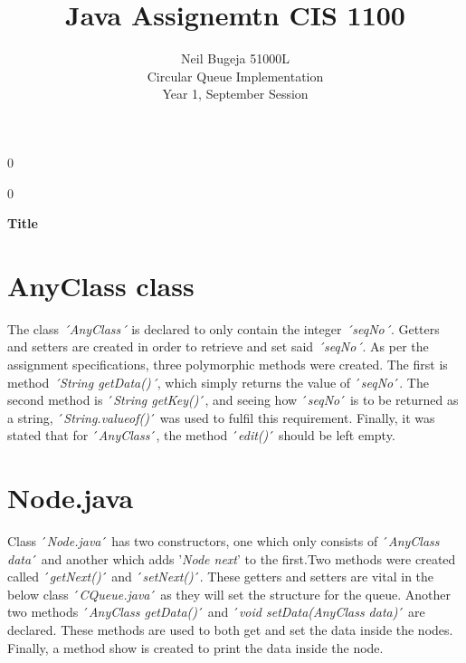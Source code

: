 \documentclass[12pt]{article}
\newcommand{\blind}{0}
\begin{document}
%

\def\spacingset#1{\renewcommand{\baselinestretch}%
{#1}\small\normalsize} \spacingset{1}



\blind
{
  \title{\bf Java Assignemtn CIS 1100}
  \author{Neil Bugeja 51000L
    \\Circular Queue Implementation
    \\Year 1, September Session\bigskip \bigskip}
  \maketitle
} \fi

\blind
{
  \bigskip
  \bigskip
  \bigskip
  \begin{center}
    {\LARGE\bf Title}
\end{center}
  \medskip
} \fi

\bigskip


\newpage
\spacingset{1.8} %

\section{AnyClass class}
The class \emph{´AnyClass´} is declared to only contain the integer \emph{´seqNo´}. Getters and setters are created in order to retrieve and set said \emph{´seqNo´}. As per the assignment specifications, three polymorphic methods were created. The first is method \emph{´String getData()´}, which simply returns the value of ´\emph{seqNo}´. The second method is ´\emph{String getKey()}´, and seeing how ´\emph{seqNo}´ is to be returned as a string, ´\emph{String.valueof()}´ was used to fulfil this requirement. Finally, it was stated that for ´\emph{AnyClass}´, the method ´\emph{edit()}´ should be left empty.
\bigskip

\section{Node.java}
Class ´\emph{Node.java}´ has two constructors, one which only consists of ´\emph{AnyClass data}´ and another which adds '\emph{Node next}' to the first.Two methods were created called ´\emph{getNext()}´ and ´\emph{setNext()}´. These getters and setters are vital in the below class ´\emph{CQueue.java}´ as they will set the structure for the queue. Another two methods ´\emph{AnyClass getData()}´ and ´\emph{void setData(AnyClass data)}´ are declared. These methods are used to both get and set the data inside the nodes. Finally, a method show is created to print the data inside the node.
\bigskip
\end{document}
